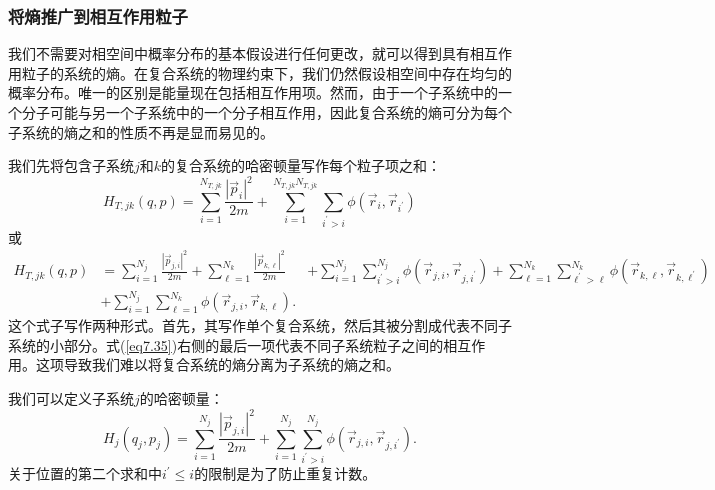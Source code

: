 \documentclass[UTF8]{ctexart}
\numberwithin{equation}{section}%
\numberwithin{figure}{section}%
\begin{document}
    \subsubsection{将熵推广到相互作用粒子}
    我们不需要对相空间中概率分布的基本假设进行任何更改，就可以得到具有相互作用粒子的系统的熵。在复合系统的物理约束下，我们仍然假设相空间中存在均匀的概率分布。唯一的区别是能量现在包括相互作用项。然而，由于一个子系统中的一个分子可能与另一个子系统中的一个分子相互作用，因此复合系统的熵可分为每个子系统的熵之和的性质不再是显而易见的。

    我们先将包含子系统$j$和$k$的复合系统的哈密顿量写作每个粒子项之和：
    \begin{equation}
    H_{T, j k}(q, p)=\sum_{i=1}^{N_{T, j k}} \frac{\left|\vec{p}_{i}\right|^{2}}{2 m}+\sum_{i=1}^{N_{T, j k} N_{T, j k}} \sum_{i^{\prime}>i} \phi\left(\vec{r}_{i}, \vec{r}_{i^{\prime}}\right)
    \end{equation}
    或
    \begin{align}\label{eq7.35}
    H_{T, j k}(q, p)&=\sum_{i=1}^{N_{j}} \frac{\left|\vec{p}_{j, i}\right|^{2}}{2 m}+\sum_{\ell=1}^{N_{k}} \frac{\left|\vec{p}_{k, \ell}\right|^{2}}{2 m}
    &+\sum_{i=1}^{N_{j}} \sum_{i^{\prime}>i}^{N_{j}} \phi\left(\vec{r}_{j, i}, \vec{r}_{j, i^{\prime}}\right)+\sum_{\ell=1}^{N_{k}} \sum_{\ell^{\prime}>\ell}^{N_{k}} \phi\left(\vec{r}_{k, \ell}, \vec{r}_{k, \ell^{\prime}}\right) \\
    &+\sum_{i=1}^{N_{j}} \sum_{\ell=1}^{N_{k}} \phi\left(\vec{r}_{j, i}, \vec{r}_{k, \ell}\right) .
    \end{align}
    这个式子写作两种形式。首先，其写作单个复合系统，然后其被分割成代表不同子系统的小部分。式(\ref{eq7.35})右侧的最后一项代表不同子系统粒子之间的相互作用。这项导致我们难以将复合系统的熵分离为子系统的熵之和。

    我们可以定义子系统$j$的哈密顿量：
    \begin{equation}
        H_{j}\left(q_{j}, p_{j}\right)=\sum_{i=1}^{N_{j}} \frac{\left|\vec{p}_{j, i}\right|^{2}}{2 m}+\sum_{i=1}^{N_{j}} \sum_{i^{\prime}>i}^{N_{j}} \phi\left(\vec{r}_{j, i}, \vec{r}_{j, i^{\prime}}\right) .
    \end{equation}
    关于位置的第二个求和中$i^{\prime}\leq i$的限制是为了防止重复计数。
\end{document}
